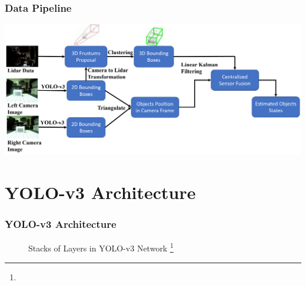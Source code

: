 \documentclass[10pt]{beamer}
\begin{document}
\begin{frame}
\frametitle{Data Pipeline}
\centering
\includegraphics[width = 1\textwidth]{Images/Datapipeline.png}
    
\end{frame}


\section{YOLO-v3 Architecture}

\begin{frame}
\frametitle{YOLO-v3 Architecture}

\begin{figure}
    \centering
    \caption{Stacks of Layers in YOLO-v3 Network \footnote[frame]{}}
\end{figure}

\end{frame}
\end{document}
